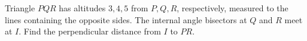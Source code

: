 Triangle $PQR$ has altitudes $3,4,5$ from $P,Q,R$, respectively, measured to the lines containing the opposite sides. The internal angle bisectors at $Q$ and $R$ meet at $I$. Find the perpendicular distance from $I$ to $PR$.

